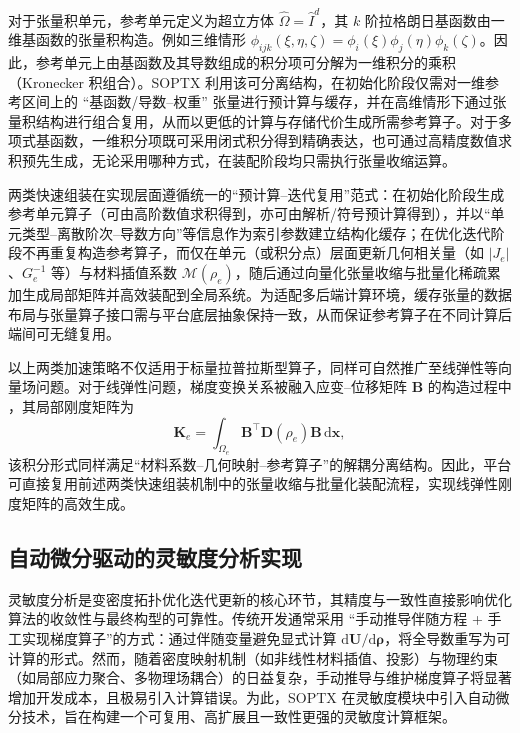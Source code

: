 对于张量积单元，参考单元定义为超立方体 $\hat\Omega=\hat I^d$，其 $k$ 阶拉格朗日基函数由一维基函数的张量积构造。例如三维情形 $\phi_{ijk}(\xi,\eta,\zeta)=\phi_i(\xi)\phi_j(\eta)\phi_k(\zeta)$。因此，参考单元上由基函数及其导数组成的积分项可分解为一维积分的乘积（Kronecker 积组合）。SOPTX 利用该可分离结构，在初始化阶段仅需对一维参考区间上的 “基函数/导数--权重” 张量进行预计算与缓存，并在高维情形下通过张量积结构进行组合复用，从而以更低的计算与存储代价生成所需参考算子。对于多项式基函数，一维积分项既可采用闭式积分得到精确表达，也可通过高精度数值求积预先生成，无论采用哪种方式，在装配阶段均只需执行张量收缩运算。

两类快速组装在实现层面遵循统一的“预计算{--}迭代复用”范式：在初始化阶段生成参考单元算子（可由高阶数值求积得到，亦可由解析/符号预计算得到），并以“单元类型{--}离散阶次{--}导数方向”等信息作为索引参数建立结构化缓存；在优化迭代阶段不再重复构造参考算子，而仅在单元（或积分点）层面更新几何相关量（如 $|J_e|$、$G_e^{-1}$ 等）与材料插值系数 $\mathcal{M}(\rho_e)$，随后通过向量化张量收缩与批量化稀疏累加生成局部矩阵并高效装配到全局系统。为适配多后端计算环境，缓存张量的数据布局与张量算子接口需与平台底层抽象保持一致，从而保证参考算子在不同计算后端间可无缝复用。

以上两类加速策略不仅适用于标量拉普拉斯型算子，同样可自然推广至线弹性等向量场问题。对于线弹性问题，梯度变换关系被融入应变--位移矩阵 $\boldsymbol{B}$ 的构造过程中 ，其局部刚度矩阵为
\[
\boldsymbol{K}_e=\int_{\Omega_e}\boldsymbol{B}^{\top}\boldsymbol{D}(\rho_e)\boldsymbol{B}\,\mathrm d\boldsymbol{x},
\]
该积分形式同样满足“材料系数{--}几何映射{--}参考算子”的解耦分离结构。因此，平台可直接复用前述两类快速组装机制中的张量收缩与批量化装配流程，实现线弹性刚度矩阵的高效生成。


\subsection{自动微分驱动的灵敏度分析实现}
\label{subsec:ad_sensitivity}

灵敏度分析是变密度拓扑优化迭代更新的核心环节，其精度与一致性直接影响优化算法的收敛性与最终构型的可靠性。传统开发通常采用 “手动推导伴随方程 + 手工实现梯度算子”的方式：通过伴随变量避免显式计算 $\mathrm{d}\boldsymbol{U}/\mathrm{d}\boldsymbol{\rho}$，将全导数重写为可计算的形式。然而，随着密度映射机制（如非线性材料插值、投影）与物理约束（如局部应力聚合、多物理场耦合）的日益复杂，手动推导与维护梯度算子将显著增加开发成本，且极易引入计算错误。为此，SOPTX 在灵敏度模块中引入自动微分技术，旨在构建一个可复用、高扩展且一致性更强的灵敏度计算框架。

